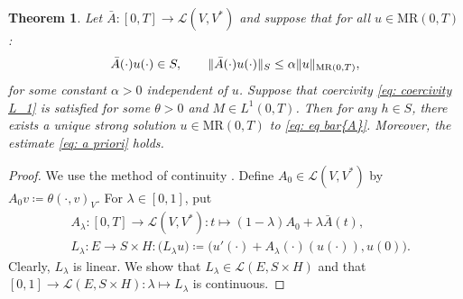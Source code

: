 \documentclass{amsart}
\renewcommand{\MR}{\mathrm{MR}}
\newcommand{\<}{\langle}
\newcommand{\?}{\rangle}
\theoremstyle{plain}
\newtheorem{theorem}{Theorem}[section]
\theoremstyle{remark}
\theoremstyle{plain}
\numberwithin{equation}{section}
\begin{document}
\begin{theorem}\label{th: well-posed with M in L^1}
Let $\bar{A}\colon [0,T]\to\mathcal{L}(V,V^*)$ and suppose that
for all $u\in\MR(0,T)$:
  \begin{align}\label{eq: bar{A} bdd MR(0,T) to S}
  \bar{A}(\cdot)u(\cdot)\in S, \qquad \|\bar{A}(\cdot)u(\cdot)\|_S\leq \alpha \|u\|_{\MR(0,T)},
  \end{align}
  for some constant $\alpha>0$ independent of $u$.
  Suppose that coercivity \eqref{eq: coercivity L_1} is satisfied for some $\theta>0$ and $M\in L^1(0,T)$. Then for any $h\in S$, there exists a unique strong solution  $u\in \MR(0,T)$ to \eqref{eq: eq bar{A}}. Moreover, the estimate  \eqref{eq: a priori} holds.
\end{theorem}
\begin{proof}
We use the method of continuity \cite[Lem. 16.2.2]{HNVWvolume3}.
Define $A_0\in\mathcal{L}(V,V^*)$ by $A_0v\coloneqq \theta(\cdot,v)_V$.
For $\lambda\in[0,1]$, put
\begin{align*}
&A_\lambda\colon [0,T]\to\mathcal{L}(V,V^*)\colon t\mapsto(1-\lambda){A}_0+\lambda\bar{A}(t), \\
& L_\lambda\colon E\to S\times H\colon \big(L_\lambda u\big)\coloneqq  \big(u'(\cdot)+A_\lambda(\cdot)(u(\cdot)),u(0)\big).
\end{align*}
Clearly, $L_\lambda$ is linear. We show that $L_\lambda\in \mathcal{L}(E,S\times H)$ and that
$[0,1]\to \mathcal{L}(E,S\times H)\colon \lambda\mapsto L_\lambda$ is continuous.



\end{proof}
\end{document}
